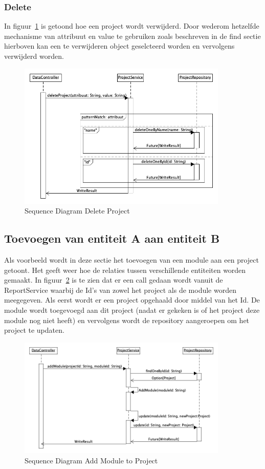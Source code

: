 \subsubsection*{Delete}
In figuur~\ref{fig:seqdiagDeleteProj} is getoond hoe een project wordt verwijderd. Door wederom hetzelfde mechanisme van attribuut en value te gebruiken zoals beschreven in de find sectie hierboven kan een te verwijderen object geselcteerd worden en vervolgens verwijderd worden.
\begin{figure}[h]
    \myfloatalign
    \includegraphics[width=10cm]{gfx/umlet/exports/CRUD-DeleteProject}
    \caption{Sequence Diagram Delete Project }
    \label{fig:seqdiagDeleteProj}
\end{figure}

\subsection{Toevoegen van entiteit A aan entiteit B}\label{subsec:toevoegen-van-entiteit-a-aan-entiteit-b}
Als voorbeeld wordt in deze sectie het toevoegen van een module aan een project getoont. Het geeft weer hoe de relaties tussen verschillende entiteiten worden gemaakt. In figuur~\ref{fig:seqdiagModToProj} is te zien dat er een call
gedaan wordt vanuit de ReportService waarbij de Id's van zowel het project als de module worden meegegeven. Als eerst wordt er een project opgehaald door middel van het Id. De module wordt toegevoegd aan dit project (nadat er gekeken is of het project deze module nog niet heeft) en vervolgens wordt de repository aangeroepen om het project te updaten.
\begin{figure}[h]
    \myfloatalign
    \includegraphics[width=10cm]{gfx/umlet/exports/Relation-ModuleToProject}
    \caption{Sequence Diagram Add Module to Project }
    \label{fig:seqdiagModToProj}
\end{figure}
\newpage
